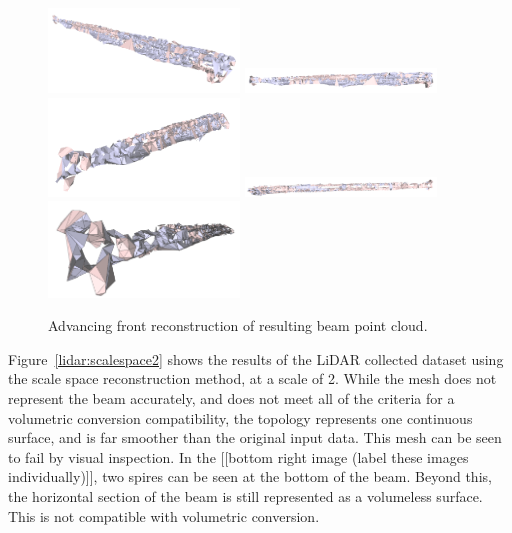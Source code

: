 \documentclass[12pt]{drexelthesis}
\begin{document}
\begin{figure}[!ht]
	\centering
		\includegraphics[width=2in]{real-lab-scans/meshed/advancedfront00.png}
		\includegraphics[width=2in]{real-lab-scans/meshed/advancedfront01.png}
		\includegraphics[width=2in]{real-lab-scans/meshed/advancedfront02.png}
		\includegraphics[width=2in]{real-lab-scans/meshed/advancedfront03.png}
		\includegraphics[width=2in]{real-lab-scans/meshed/advancedfront04.png}
		\caption[Advancing front reconstruction of segmented LiDAR data]{\centering Advancing front reconstruction of resulting beam point cloud.}
	\label{lidar:advancefront}
\end{figure}

Figure~\ref{lidar:scalespace2} shows the results of the LiDAR collected dataset using the scale space reconstruction method, at a scale of 2. While the mesh does not represent the beam accurately, and does not meet all of the criteria for a volumetric conversion compatibility, the topology represents one continuous surface, and is far smoother than the original input data. This mesh can be seen to fail by visual inspection. In the [[bottom right image (label these images individually)]], two spires can be seen at the bottom of the beam. Beyond this, the horizontal section of the beam is still represented as a volumeless surface. This is not compatible with volumetric conversion.
\end{document}
